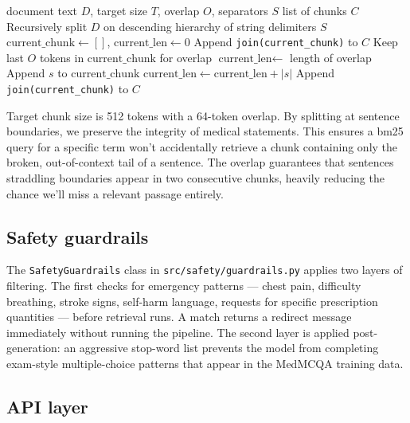 \begin{algorithm}
\caption{RecursiveSentenceChunker}\label{alg:chunker}
\begin{algorithmic}
    \Require document text $D$, target size $T$, overlap $O$, separators $S$
    \Ensure list of chunks $C$
    \State Recursively split $D$ on descending hierarchy of string delimiters $S$
    \State $\text{current\_chunk} \gets []$, $\text{current\_len} \gets 0$
            \State Append \texttt{join(current\_chunk)} to $C$
            \State Keep last $O$ tokens in $\text{current\_chunk}$ for overlap
            \State $\text{current\_len} \gets$ length of overlap
        \EndIf
        \State Append $s$ to $\text{current\_chunk}$
        \State $\text{current\_len} \gets \text{current\_len} + |s|$
    \EndFor
        \State Append \texttt{join(current\_chunk)} to $C$
    \EndIf
\end{algorithmic}
\end{algorithm}

Target chunk size is 512 tokens with a 64-token overlap. By splitting at sentence boundaries, we preserve the integrity of medical statements. This ensures a \ac{bm25} query for a specific term won't accidentally retrieve a chunk containing only the broken, out-of-context tail of a sentence. The overlap guarantees that sentences straddling boundaries appear in two consecutive chunks, heavily reducing the chance we'll miss a relevant passage entirely.

\subsection{Safety guardrails}

The \texttt{SafetyGuardrails} class in \texttt{src/safety/guardrails.py} applies two layers of filtering. The first checks for emergency patterns --- chest pain, difficulty breathing, stroke signs, self-harm language, requests for specific prescription quantities --- before retrieval runs. A match returns a redirect message immediately without running the pipeline. The second layer is applied post-generation: an aggressive stop-word list prevents the model from completing exam-style multiple-choice patterns that appear in the MedMCQA training data.

\subsection{API layer}

